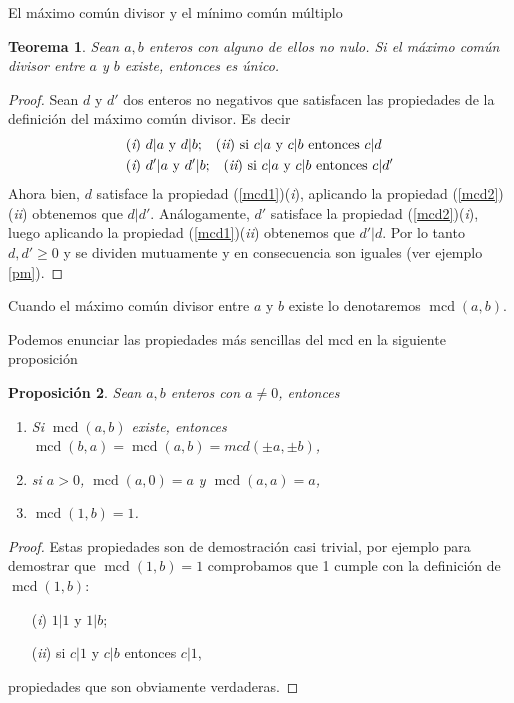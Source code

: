 \documentclass[11pt,spanish,makeidx]{amsbook}
\newtheorem{teorema}{Teorema}[section]
\newtheorem{proposicion}[teorema]{Proposici\'on}
\theoremstyle{definition}
\theoremstyle{remark}
\newcommand \mcd{\operatorname{mcd}}
\begin{document}
\begin{section}{El máximo común divisor y el mínimo común múltiplo}
\begin{teorema}\label{tmcd} 
Sean $a,b$ enteros con alguno de ellos no nulo. Si el máximo común divisor entre  $a$ y $b$ existe, entonces es único.  
\end{teorema}
\begin{proof}
Sean $d$ y $d'$ dos enteros no negativos que satisfacen las propiedades de la definición del máximo común divisor. Es decir
\begin{align}
&\text{({\em i}) $ d|a$ y $d|b$;\quad ({\em ii}) si $ c|a $ y $c|b$ entonces $ c|d$} \label{mcd1}\\
&\text{({\em i}) $ d'|a$ y $d'|b$;\quad ({\em ii}) si $ c|a $ y $c|b$ entonces $ c|d'$} \label{mcd2}
\end{align}
Ahora bien, $d$ satisface la propiedad (\ref{mcd1})({\em i}), aplicando la propiedad (\ref{mcd2})({\em ii}) obtenemos que $d|d'$. Análogamente,  $d'$ satisface la propiedad (\ref{mcd2})({\em i}),  luego aplicando la propiedad (\ref{mcd1})({\em ii}) obtenemos que $d'|d$. Por lo tanto $d, d' \ge 0$ y  se dividen mutuamente y en consecuencia son iguales (ver ejemplo \ref{pm}).
\end{proof}

Cuando  el máximo común divisor entre $a$ y $b$ existe lo denotaremos $\mcd(a,b)$.

Podemos enunciar las propiedades más sencillas del mcd en la siguiente proposición

\begin{proposicion} Sean $a,b$ enteros con $a \not = 0$, entonces
\begin{enumerate}
\item Si $\mcd(a,b)$ existe, entonces $\mcd(b,a) = \mcd(a,b) = mcd(\pm a, \pm b)$,
\item si $a>0$,  $\mcd(a,0) = a$ y $\mcd(a,a) = a$,
\item $\mcd(1,b) = 1$.
\end{enumerate}
\end{proposicion}
\begin{proof}
Estas propiedades son de demostración casi trivial, por ejemplo para demostrar que  $\mcd(1,b) = 1$ comprobamos que 1 cumple con la definición de $\mcd(1,b)$:
\begin{enumerate}
\item[({\em i})] $ 1|1$ y $1|b$;
\item[({\em ii})] si $ c|1 $ y $c|b$ entonces $ c|1$,
\end{enumerate}
propiedades que son obviamente verdaderas.


\end{proof}
\end{section}
\end{document}
